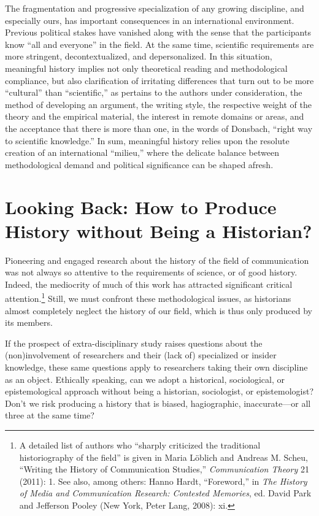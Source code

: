 \documentclass{tufte-handout}
\begin{document}
The fragmentation and progressive specialization of any growing
discipline, and especially ours, has important consequences in an
international environment. Previous political stakes have vanished along
with the sense that the participants know ``all and everyone'' in the
field. At the same time, scientific requirements are more stringent,
decontextualized, and depersonalized. In this situation, meaningful
history implies not only theoretical reading and methodological
compliance, but also clarification of irritating differences that turn
out to be more ``cultural'' than ``scientific,'' as pertains to the
authors under consideration, the method of developing an argument, the
writing style, the respective weight of the theory and the empirical
material, the interest in remote domains or areas, and the acceptance
that there is more than one, in the words of Donsbach, ``right way to
scientific knowledge.'' In sum, meaningful history relies upon the
resolute creation of an international ``milieu,'' where the delicate
balance between methodological demand and political significance can be
shaped afresh.

\hypertarget{looking-back-how-to-produce-history-without-being-a-historian}{%
\section{Looking Back: How to Produce History without Being a
Historian?}\label{looking-back-how-to-produce-history-without-being-a-historian}}

Pioneering and engaged research about the history of the field of
communication was not always so attentive to the requirements of
science, or of good history. Indeed, the mediocrity of much of this work
has attracted significant critical
attention.\footnote{A detailed list of authors who ``sharply criticized the traditional
  historiography of the field'' is given in Maria Löblich and Andreas M.
  Scheu, ``Writing the History of Communication Studies,''
  \emph{Communication Theory} 21 (2011): 1. See also, among others:
  Hanno Hardt, ``Foreword,'' in \emph{The History of Media and
  Communication Research: Contested Memories}, ed. David Park and
  Jefferson Pooley (New York, Peter Lang, 2008): xi.
} Still, we must confront
these methodological issues, as historians almost completely neglect the
history of our field, which is thus only produced by its members.

If the prospect of extra-disciplinary study raises questions about the
(non)involvement of researchers and their (lack of) specialized or
insider knowledge, these same questions apply to researchers taking
their own discipline as an object. Ethically speaking, can we adopt a
historical, sociological, or epistemological approach without being a
historian, sociologist, or epistemologist? Don't we risk producing a
history that is biased, hagiographic, inaccurate---or all three at the
same time?
\end{document}
